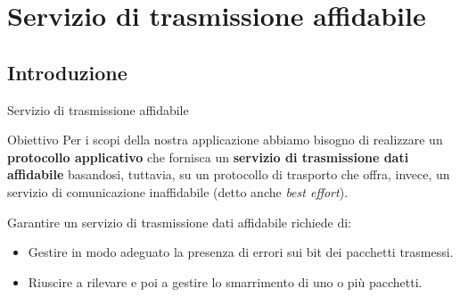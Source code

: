 \documentclass[10pt]{beamer}
\begin{document}
\section{Servizio di trasmissione affidabile}

\subsection{Introduzione}
\begin{frame}[fragile]{Servizio di trasmissione affidabile}{}

\begin{block}{Obiettivo}
Per i scopi della nostra applicazione abbiamo bisogno di realizzare un \textbf{protocollo applicativo} che fornisca un \textbf{servizio di trasmissione dati affidabile} basandosi, tuttavia, su un protocollo di trasporto che offra, invece, un servizio di comunicazione inaffidabile (detto anche \textit{best effort}).
\end{block}

\vspace*{10px}

Garantire un servizio di trasmissione dati affidabile richiede di:

\begin{itemize}
\item Gestire in modo adeguato la presenza di errori sui bit dei pacchetti trasmessi.
\item Riuscire a rilevare e poi a gestire lo smarrimento di uno o più pacchetti.
\end{itemize}

\end{frame}

\end{document}
